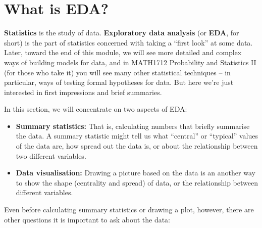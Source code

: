 \documentclass[
  a4paper,
]{book}
\providecommand{\tightlist}{%
  \setlength{\itemsep}{0pt}\setlength{\parskip}{0pt}}
\theoremstyle{definition}
\theoremstyle{definition}
\theoremstyle{definition}
\theoremstyle{definition}
\theoremstyle{remark}
\begin{document}
\hypertarget{what-is-eda}{%
\section{What is EDA?}\label{what-is-eda}}

\textbf{Statistics} is the study of data. \textbf{Exploratory data analysis} (or \textbf{EDA}, for short) is the part of statistics concerned with taking a ``first look'' at some data. Later, toward the end of this module, we will see more detailed and complex ways of building models for data, and in MATH1712 Probability and Statistics II (for those who take it) you will see many other statistical techniques -- in particular, ways of testing formal hypotheses for data. But here we're just interested in first impressions and brief summaries.

In this section, we will concentrate on two aspects of EDA:

\begin{itemize}
\tightlist
\item
  \textbf{Summary statistics:} That is, calculating numbers that briefly summarise the data. A summary statistic might tell us what ``central'' or ``typical'' values of the data are, how spread out the data is, or about the relationship between two different variables.
\item
  \textbf{Data visualisation:} Drawing a picture based on the data is an another way to show the shape (centrality and spread) of data, or the relationship between different variables.
\end{itemize}

Even before calculating summary statistics or drawing a plot, however, there are other questions it is important to ask about the data:
\end{document}
